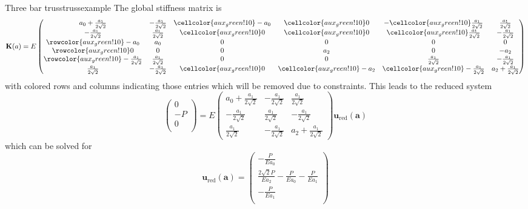 \begin{example}{Three bar truss}{trussexample}
    The global stiffness matrix is 
    \begin{equation}
        \mathbf{K}(a) = E
        \begin{pmatrix}
             a_0 + \frac{a_1}{2\sqrt{2}}&  -\frac{a_1}{2\sqrt{2}} & \cellcolor{aux_green!10}-a_0 &  \cellcolor{aux_green!10}0 & -\cellcolor{aux_green!10} \frac{a_1}{2\sqrt{2}} &  \frac{a_1}{2\sqrt{2}}\\
            -\frac{a_1}{2\sqrt{2}} &  \frac{a_1}{2\sqrt{2}} & \cellcolor{aux_green!10} 0 & \cellcolor{aux_green!10} 0 & \cellcolor{aux_green!10}\frac{a_1}{2\sqrt{2}} &  -\frac{a_1}{2\sqrt{2}} \\
            \rowcolor{aux_green!10}
             -a_0 &  a_0 & 0 &  0 & 0 & 0\\
             \rowcolor{aux_green!10}
            0 &  0 & 0 &  a_2 & 0 &  -a_2 \\
            \rowcolor{aux_green!10}
             -\frac{a_1}{2\sqrt{2}} &  \frac{a_1}{2\sqrt{2}} & 0 &  0 & \frac{a_1}{2\sqrt{2}} &  -\frac{a_1}{2\sqrt{2}}\\
            \frac{a_1}{2\sqrt{2}} &  -\frac{a_1}{2\sqrt{2}} & \cellcolor{aux_green!10} 0 &  \cellcolor{aux_green!10} -a_2 & \cellcolor{aux_green!10} -\frac{a_1}{2\sqrt{2}} &  a_2 + \frac{a_1}{2\sqrt{2}}\\
        \end{pmatrix}
    \end{equation}
    with colored rows and columns indicating those entries which will be removed due to constraints. This leads to the reduced system 
    \begin{equation}
        \begin{pmatrix}
            0 \\ -P \\ 0  \\
        \end{pmatrix}
         = E
        \begin{pmatrix}
             a_0 + \frac{a_1}{2\sqrt{2}}&  -\frac{a_1}{2\sqrt{2}} &  \frac{a_1}{2\sqrt{2}}\\
            -\frac{a_1}{2\sqrt{2}} &  \frac{a_1}{2\sqrt{2}} &  -\frac{a_1}{2\sqrt{2}} \\
            \frac{a_1}{2\sqrt{2}} &  -\frac{a_1}{2\sqrt{2}} &  a_2 + \frac{a_1}{2\sqrt{2}}
        \end{pmatrix}
        \mathbf{u}_\textrm{red} (\mathbf{a})
    \end{equation}
    which can be solved for 
    \begin{equation}
        \mathbf{u}_\textrm{red} (\mathbf{a}) = 
        \begin{pmatrix}
            -\frac{P}{Ea_0} \\  \frac{2\sqrt{2}P}{Ea_2} - \frac{P}{Ea_0} - \frac{P}{Ea_1} \\ -\frac{P}{Ea_1}  \\
        \end{pmatrix}
    \end{equation}


\end{example}
